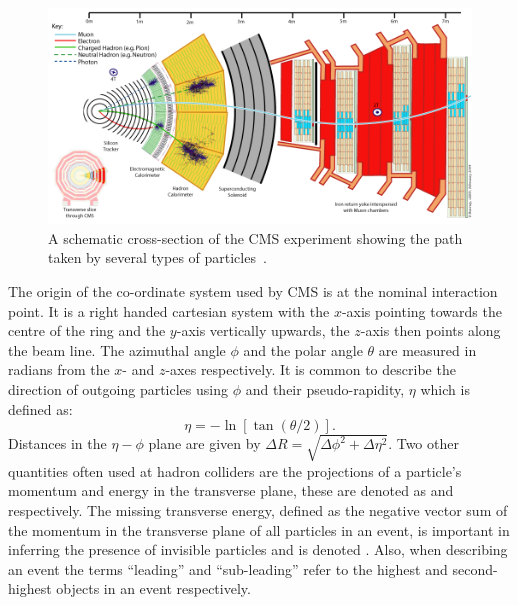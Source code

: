 \begin{figure}
  \includegraphics[width=1.2\largefigwidth]{plots/detector/CMS_Slice.png}
  \caption[A schematic cross-section of the CMS experiment showing the path taken by several types of particles.]{A schematic cross-section of the CMS experiment showing the path taken by several types of particles~\cite{CMSSlice}.}
  \label{fig:cmsschematic2}
\end{figure}

The origin of the co-ordinate system used by CMS is at the nominal interaction point. It is a right handed cartesian system with the $x$-axis pointing towards the centre of the \LHC ring and the $y$-axis vertically upwards, the $z$-axis then points along the beam line. The azimuthal angle $\phi$ and the polar angle $\theta$ are measured in radians from the $x$- and $z$-axes respectively. It is common to describe the direction of outgoing particles using $\phi$ and their pseudo-rapidity, $\eta$ which is defined as:
\begin{equation}
  \label{eq:eta}
  \eta=-\ln[\tan(\theta/2)].
\end{equation}
Distances in the $\eta-\phi$ plane are given by $\Delta R=\sqrt{\Delta\phi^2+\Delta\eta^2}$. Two other quantities often used at hadron colliders are the projections of a particle's momentum and energy in the transverse plane, these are denoted as \pt and \Et respectively. The missing transverse energy, defined as the negative vector sum of the momentum in the transverse plane of all particles in an event, is important in inferring the presence of invisible particles and is denoted \MET. Also, when describing an event the terms ``leading'' and ``sub-leading'' refer to the highest and second-highest \pt objects in an event respectively.

